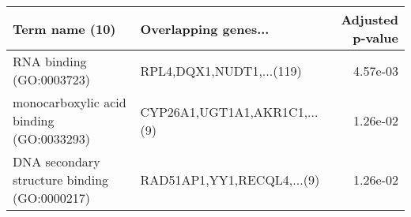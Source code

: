 \begin{tabular}{llr}
\toprule
                              Term name (10) &         Overlapping genes... &  Adjusted p-value \\
\midrule
                    RNA binding (GO:0003723) &     RPL4,DQX1,NUDT1,...(119) &          4.57e-03 \\
    monocarboxylic acid binding (GO:0033293) & CYP26A1,UGT1A1,AKR1C1,...(9) &          1.26e-02 \\
DNA secondary structure binding (GO:0000217) &   RAD51AP1,YY1,RECQL4,...(9) &          1.26e-02 \\
\bottomrule
\end{tabular}
